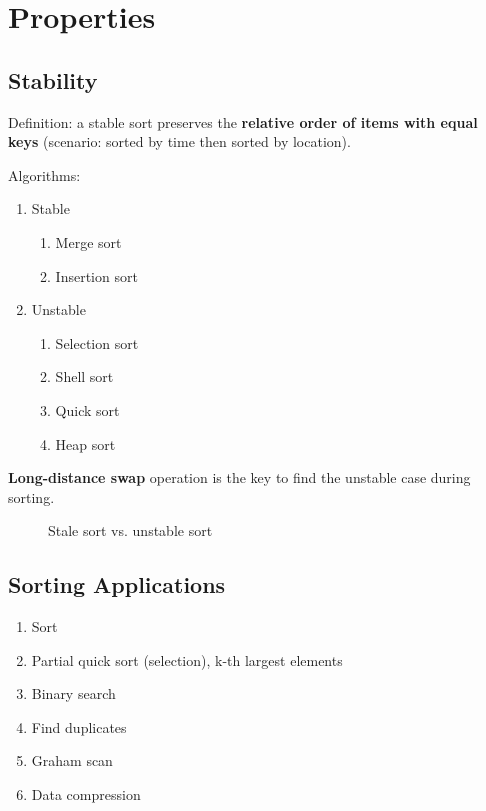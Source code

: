 \section{Properties}
\subsection{Stability}
Definition: a stable sort preserves the \textbf{relative order of items with equal keys} (scenario: sorted by time then sorted by location). 

Algorithms:
\begin{enumerate}
\item Stable
\begin{enumerate}
\item Merge sort
\item Insertion sort
\end{enumerate} 
\item Unstable
\begin{enumerate}
\item Selection sort
\item Shell sort
\item Quick sort
\item Heap sort
\end{enumerate}
\end{enumerate}
\textbf{Long-distance swap} operation is the key to find the unstable case during sorting. 
\begin{figure}[hbtp]
\centering
{}
\caption{Stale sort vs. unstable sort}
\label{fig:trie} 
\end{figure}

\subsection{Sorting Applications}
\begin{enumerate}
\item Sort
\item Partial quick sort (selection), k-th largest elements 
\item Binary search
\item Find duplicates 
\item Graham scan
\item Data compression
\end{enumerate}


